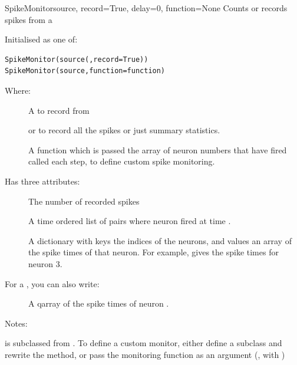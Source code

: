 \documentclass[letterpaper,10pt,english]{manual}
\begin{document}
\hypertarget{brian.SpikeMonitor}{}\begin{classdesc}{SpikeMonitor}{source, record=True, delay=0, function=None}
Counts or records spikes from a \hyperlink{brian.NeuronGroup}{}

Initialised as one of:

\begin{Verbatim}[commandchars=@\[\]]
SpikeMonitor(source(,record=True))
SpikeMonitor(source,function=function)
\end{Verbatim}

Where:
\begin{description}
\item[] \leavevmode
A \hyperlink{brian.NeuronGroup}{} to record from

\item[] \leavevmode
{} or  to record all the spikes or just summary
statistics.

\item[] \leavevmode
A function  which is passed the array of neuron
numbers that have fired called each step, to define
custom spike monitoring.

\end{description}

Has three attributes:
\begin{description}
\item[] \leavevmode
The number of recorded spikes

\item[] \leavevmode
A time ordered list of pairs  where neuron  fired
at time .

\item[] \leavevmode
A dictionary with keys the indices of the neurons, and values an
array of the spike times of that neuron. For example,
 gives the spike times for neuron 3.

\end{description}

For  a \hyperlink{brian.SpikeMonitor}{}, you can also write:
\begin{description}
\item[] \leavevmode
A qarray of the spike times of neuron .

\end{description}

Notes:

\hyperlink{brian.SpikeMonitor}{} is subclassed from \hyperlink{brian.Connection}{}.
To define a custom monitor, either define a subclass and
rewrite the  method, or pass the monitoring function
as an argument (, with )
\end{classdesc}
\end{document}
